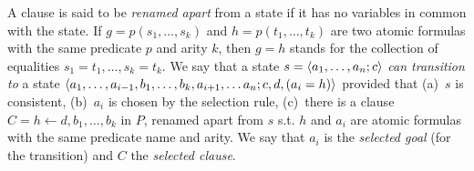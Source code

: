 \documentclass{article} %
\begin{document}
A clause is said to be {\em renamed apart} from a state if it has no variables in common with the state.  If $g=p(s_1,\ldots,s_k)$ and $h=p(t_1,\ldots, t_k)$ are two atomic formulas with the same predicate $p$ and arity $k$, then $g=h$ stands for the collection of equalities $s_1=t_1, \ldots, s_k=t_k$. 
We say that a state 
$s=\langle a_1, \ldots, a_n; c\rangle$ {\em can transition to} 
a state $\langle a_1, \ldots, a_{i-1}, b_1, \ldots, b_k, a_{i+1}, \ldots a_n; c, d, (a_i=h)\rangle$  provided that (a)~$s$ is consistent, (b)~$a_i$ is chosen by the selection rule, (c)~there is a clause $C=h \leftarrow d, b_1,\ldots, b_k$ in $P$, renamed apart from $s$ s.t.{} $h$ and $a_i$ are atomic formulas with the same predicate name and arity. We say that $a_i$ is the {\em selected goal} (for the transition) and $C$ the {\em selected clause}. 
\end{document}
